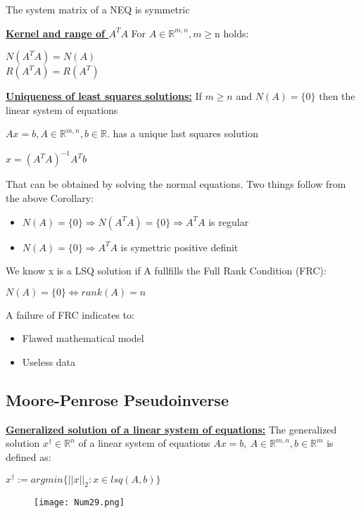 \documentclass[8pt]{extreport}
\begin{document}
The system matrix of a NEQ is symmetric


\underline{\textbf{Kernel and range of $A^TA$}} For $A \in \mathbb{R}^{m,n}, m \geq$n holds:
\begin{center}
$N(A^TA) = N(A)$\\
$R(A^TA) = R(A^T)$
\end{center}

\underline{\textbf{Uniqueness of least squares solutions:}} If $m\geq n$ and $N(A) = \{0\}$ then the linear system of equations
\begin{center}
$Ax = b, A \in \mathbb{R}^{m,n}, b \in \mathbb{R}$. has a unique last squares solution

\end{center}
\begin{center}
$ x = (A^TA)^{-1}A^Tb$
\end{center}
That can be obtained by solving the normal equations.
Two things follow from the above Corollary:
\begin{itemize}
\item $N(A) = \{0\} \Rightarrow N(A^TA) = \{0\} \Rightarrow A^TA$ is regular
\item $N(A) = \{0\} \Rightarrow A^TA$ is symettric positive definit
\end{itemize}
We know x is a LSQ solution if A fullfills the Full Rank Condition (FRC):
\begin{center}
$N(A) = \{0\} \iff rank(A) = n$
\end{center}
A failure of FRC indicates to:
\begin{itemize}
\item Flawed mathematical model
\item Useless data
\end{itemize}

\subsection{Moore-Penrose Pseudoinverse}

\underline{\textbf{Generalized solution of a linear system of equations:}}
The generalized solution $x^{\dagger} \in \mathbb{R}^n$ of a linear system of equations $Ax = b, \ A \in \mathbb{R}^{m,n}, b \in \mathbb{R}^m$ is defined as:
\begin{center}
$x^{\dagger} := argmin \{||x||_2: x \in lsq(A,b)\}$
\end{center}
\begin{figure}[H]
\centering
\texttt{[image: Num29.png]}
\end{figure}
\end{document}
